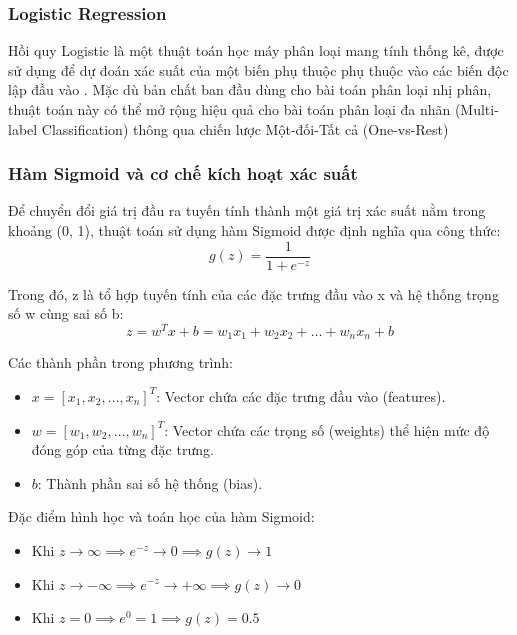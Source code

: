 \subsubsection{Logistic Regression}

Hồi quy Logistic là một thuật toán học máy phân loại mang tính thống kê, được sử dụng để dự đoán xác suất của một biến phụ thuộc phụ thuộc vào các biến độc lập đầu vào \cite{hastie2009elements}. Mặc dù bản chất ban đầu dùng cho bài toán phân loại nhị phân, thuật toán này có thể mở rộng hiệu quả cho bài toán phân loại đa nhãn (Multi-label Classification) thông qua chiến lược Một-đối-Tất cả (One-vs-Rest) \cite{hastie2009elements}

\subsubsection{Hàm Sigmoid và cơ chế kích hoạt xác suất}

Để chuyển đổi giá trị đầu ra tuyến tính thành một giá trị xác suất nằm trong khoảng (0, 1), thuật toán sử dụng hàm Sigmoid được định nghĩa qua công thức:
\begin{equation}
	g(z) = \frac{1}{1 + e^{-z}}
\end{equation}

Trong đó, z là tổ hợp tuyến tính của các đặc trưng đầu vào x và hệ thống trọng số w cùng sai số b:
\begin{equation}
	z = w^T x + b = w_1 x_1 + w_2 x_2 + \dots + w_n x_n + b
\end{equation}

Các thành phần trong phương trình:
\begin{itemize}
	\item $x = [x_1, x_2, \dots, x_n]^T$: Vector chứa các đặc trưng đầu vào (features).
	\item $w = [w_1, w_2, \dots, w_n]^T$: Vector chứa các trọng số (weights) thể hiện mức độ đóng góp của từng đặc trưng.
	\item $b$: Thành phần sai số hệ thống (bias).
\end{itemize}

Đặc điểm hình học và toán học của hàm Sigmoid:
\begin{itemize}
	\item Khi $z \to \infty \implies e^{-z} \to 0 \implies g(z) \to 1$
	
	\item Khi $z \to -\infty \implies e^{-z} \to +\infty \implies g(z) \to 0$
	
	\item Khi $z = 0 \implies e^0 = 1 \implies g(z) = 0.5$
\end{itemize}

